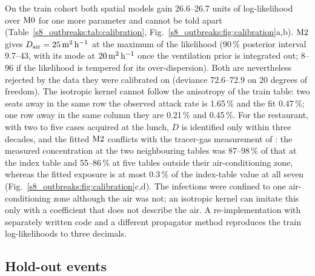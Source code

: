 On the train cohort both spatial models gain 26.6--26.7 units of log-likelihood over $\mathrm{M0}$ for one more parameter
and cannot be told apart (Table~\ref{s8_outbreaks:tab:calibration},
Fig.~\ref{s8_outbreaks:fig:calibration}a,b). $\mathrm{M2}$ gives $D_{\mathrm{air}}=25\,\mathrm{m}^2\,\mathrm{h}^{-1}$ at the maximum of the likelihood
(90\,\% posterior interval 9.7--43, with its mode at $20\,\mathrm{m}^2\,\mathrm{h}^{-1}$ once the ventilation prior is integrated out;
8--96 if the likelihood is tempered for its over-dispersion).
Both are nevertheless rejected by the data they were calibrated on (deviance 72.6--72.9 on 20 degrees of
freedom). The isotropic kernel cannot follow the anisotropy of the train table: two seats away in the same row
the observed attack rate is 1.65\,\% and the fit 0.47\,\%; one row away in the same column they are 0.21\,\%
and 0.45\,\%.
For the restaurant, with two to five cases acquired at the lunch, $D$ is identified only within three decades,
and the fitted $\mathrm{M2}$ conflicts with the tracer-gas measurement of \citet{li2021}: the measured concentration
at the two neighbouring tables was 87--98\,\% of that at the index table and 55--86\,\% at five tables outside
their air-conditioning zone, whereas the fitted exposure is at most 0.3\,\% of the index-table value at all
seven
(Fig.~\ref{s8_outbreaks:fig:calibration}c,d). The infections were confined to one air-conditioning zone
although the air was not; an isotropic kernel can imitate this only with a coefficient that does not describe
the air.
A re-implementation with separately written code and a different propagator method reproduces the train log-likelihoods to
three decimals.

\subsection{Hold-out events}\label{s8_outbreaks:sec:holdoutdetail}

